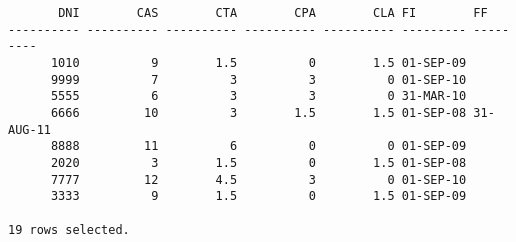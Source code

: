 \documentclass[11pt]{report}
\begin{document}
\begin{itemize}
\begin{verbatim}
       DNI        CAS        CTA        CPA        CLA FI        FF                                                                                                                                     
---------- ---------- ---------- ---------- ---------- --------- ---------                                                                                                                              
      1010          9        1.5          0        1.5 01-SEP-09                                                                                                                                        
      9999          7          3          3          0 01-SEP-10                                                                                                                                        
      5555          6          3          3          0 31-MAR-10                                                                                                                                        
      6666         10          3        1.5        1.5 01-SEP-08 31-AUG-11                                                                                                                              
      8888         11          6          0          0 01-SEP-09                                                                                                                                        
      2020          3        1.5          0        1.5 01-SEP-08                                                                                                                                        
      7777         12        4.5          3          0 01-SEP-10                                                                                                                                        
      3333          9        1.5          0        1.5 01-SEP-09                                                                                                                                        

19 rows selected.
  \end{verbatim}
\end{itemize}
\end{document}
